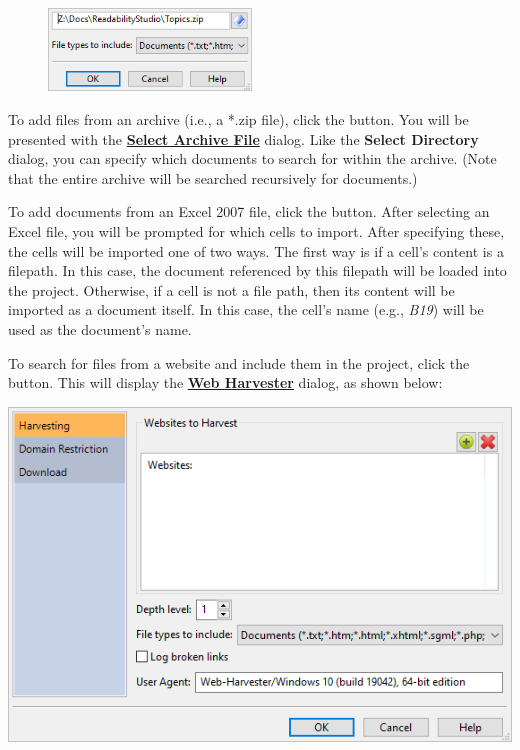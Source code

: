 \documentclass[
]{book}
\theoremstyle{definition}
\theoremstyle{definition}
\theoremstyle{definition}
\theoremstyle{definition}
\theoremstyle{remark}
\begin{document}
\begin{figure}
\includegraphics[width=0.48\textwidth,height=\textheight]{Images/selectarchive.png}

\end{figure}

To add files from an archive (i.e., a *.zip file), click the  button. You will be presented with the \protect\hyperlink{select-archive}{\textbf{Select Archive File}} dialog. Like the \textbf{Select Directory} dialog, you can specify which documents to search for within the archive. (Note that the entire archive will be searched recursively for documents.)

To add documents from an Excel 2007 file, click the  button. After selecting an Excel file, you will be prompted for which cells to import. After specifying these, the cells will be imported one of two ways. The first way is if a cell's content is a filepath. In this case, the document referenced by this filepath will be loaded into the project. Otherwise, if a cell is not a file path, then its content will be imported as a document itself. In this case, the cell's name (e.g., \emph{B19}) will be used as the document's name.

To search for files from a website and include them in the project, click the  button. This will display the \protect\hyperlink{web-harvester}{\textbf{Web Harvester}} dialog, as shown below:

\begin{center}\includegraphics[width=0.75\linewidth,]{Images/webharvester} \end{center}
\end{document}
